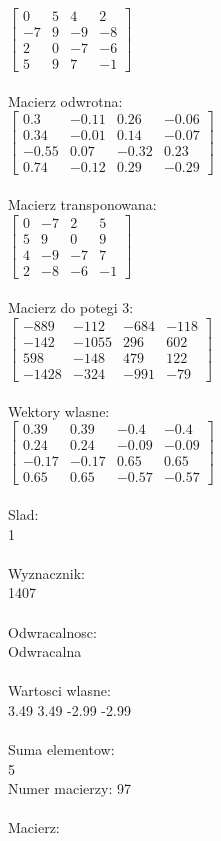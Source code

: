 \documentclass[a4paper,12pt]{article}
\begin{document}
$\begin{bmatrix} 0&5&4&2\\-7&9&-9&-8\\2&0&-7&-6\\5&9&7&-1 \end{bmatrix}$
\\
\\
Macierz odwrotna:\\

$\begin{bmatrix} 0.3&-0.11&0.26&-0.06\\0.34&-0.01&0.14&-0.07\\-0.55&0.07&-0.32&0.23\\0.74&-0.12&0.29&-0.29 \end{bmatrix}$
\\
\\
Macierz transponowana:\\

$\begin{bmatrix} 0&-7&2&5\\5&9&0&9\\4&-9&-7&7\\2&-8&-6&-1 \end{bmatrix}$
\\
\\
Macierz do potegi 3:\\

$\begin{bmatrix} -889&-112&-684&-118\\-142&-1055&296&602\\598&-148&479&122\\-1428&-324&-991&-79 \end{bmatrix}$
\\
\\
Wektory wlasne:\\

$\begin{bmatrix} 0.39&0.39&-0.4&-0.4\\0.24&0.24&-0.09&-0.09\\-0.17&-0.17&0.65&0.65\\0.65&0.65&-0.57&-0.57 \end{bmatrix}$
\\
\\
Slad:\\
1
\\
\\
Wyznacznik:\\
1407
\\
\\
Odwracalnosc:\\
Odwracalna
\\
\\
Wartosci wlasne:\\
3.49 3.49 -2.99 -2.99
\\
\\
Suma elementow:\\
5
\\
\newpage
Numer macierzy:
97
\\
\\
Macierz:\\
\end{document}
